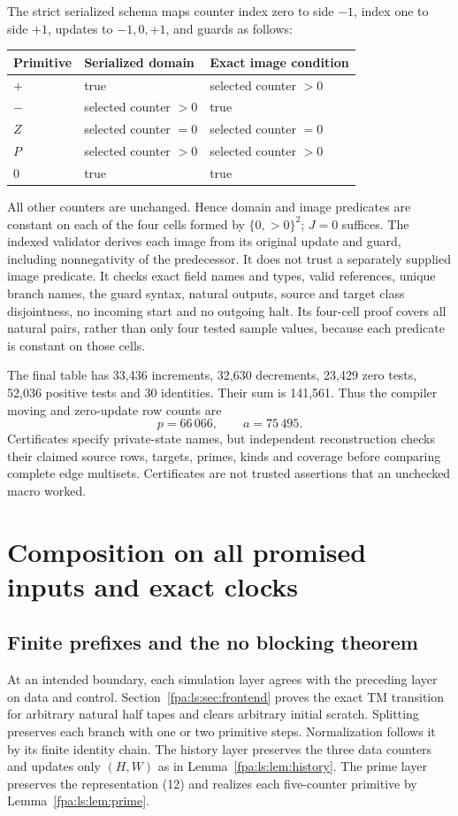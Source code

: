 \documentclass[11pt,a4paper]{article}
\numberwithin{equation}{section}
\begin{document}
The strict serialized schema maps counter index zero to side $-1$, index
one to side $+1$, updates to $-1,0,+1$, and guards as follows:
\begin{center}
\begin{tabular}{lll}\toprule
Primitive & Serialized domain & Exact image condition\\\midrule
$+$ & true & selected counter $>0$\\
$-$ & selected counter $>0$ & true\\
$Z$ & selected counter $=0$ & selected counter $=0$\\
$P$ & selected counter $>0$ & selected counter $>0$\\
$0$ & true & true\\\bottomrule
\end{tabular}
\end{center}
All other counters are unchanged. Hence domain and image predicates are
constant on each of the four cells formed by $\{0,>0\}^2$; $J=0$ suffices.
The indexed validator derives each image from its original update and guard,
including nonnegativity of the predecessor. It does not trust a separately
supplied image predicate. It checks exact field names and types, valid
references, unique branch names, the guard syntax, natural outputs, source
and target class disjointness, no incoming start and no outgoing halt.
Its four-cell proof covers all natural pairs, rather than only four tested
sample values, because each predicate is constant on those cells.

The final table has 33,436 increments, 32,630 decrements, 23,429 zero tests,
52,036 positive tests and 30 identities. Their sum is 141,561. Thus the
compiler moving and zero-update row counts are
\[
                   p=66\,066,\qquad a=75\,495.          \tag{23}
\]
Certificates specify private-state names, but independent reconstruction
checks their claimed source rows, targets, primes, kinds and coverage before
comparing complete edge multisets. Certificates are not trusted assertions
that an unchecked macro worked.
\section{Composition on all promised inputs and exact clocks}\label{fpa:ls:sec:composition}
\subsection{Finite prefixes and the no blocking theorem}
At an intended boundary, each simulation layer agrees with the preceding
layer on data and control. Section~\ref{fpa:ls:sec:frontend} proves the exact TM
transition for arbitrary natural half tapes and clears arbitrary initial
scratch. Splitting preserves each branch with one or two primitive steps.
Normalization follows it by its finite identity chain. The history layer
preserves the three data counters and updates only $(H,W)$ as in
Lemma~\ref{fpa:ls:lem:history}. The prime layer preserves the representation (12)
and realizes each five-counter primitive by Lemma~\ref{fpa:ls:lem:prime}.
\end{document}
